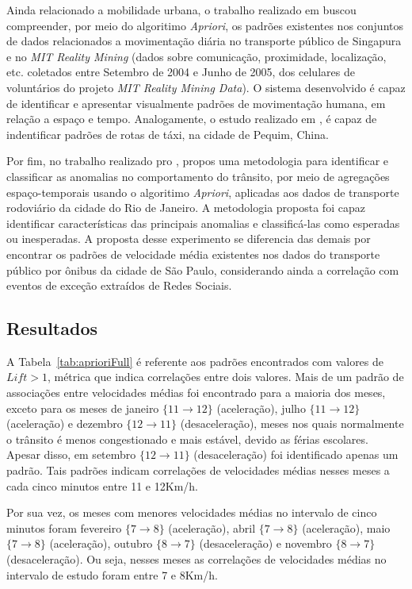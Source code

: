 \documentclass[
	12pt,				%
	oneside,			%
	a4paper,			%
	english,			%
	brazil				%
	]{abntex2ppgsi}
\begin{document}
{{{Ainda relacionado a mobilidade urbana, o trabalho realizado em \cite{zeng2017visual} buscou compreender, por meio do algoritimo \textit{Apriori}, os padrões existentes nos conjuntos de dados relacionados a movimentação diária no transporte público de Singapura e no \textit{MIT Reality Mining} (dados sobre comunicação, proximidade, localização, etc. coletados entre Setembro de 2004 e Junho de 2005, dos celulares de voluntários do projeto \textit{MIT Reality Mining Data}). O sistema desenvolvido é capaz de identificar e apresentar visualmente padrões de movimentação humana, em relação a espaço e tempo. Analogamente, o estudo realizado em \cite{yu2018discovering}, é capaz de indentificar padrões de rotas de táxi, na cidade de Pequim, China.

Por fim, no trabalho realizado pro \cite{cruz2018detecccao},  propos uma metodologia para identificar e classificar as anomalias no comportamento do trânsito, por meio de agregações espaço-temporais usando o algoritimo \textit{Apriori}, aplicadas aos dados de transporte rodoviário  da cidade do Rio de Janeiro. A metodologia proposta foi capaz identificar características das principais anomalias e classificá-las como esperadas ou inesperadas. A proposta desse experimento se diferencia das demais por encontrar os padrões de velocidade média existentes nos dados do transporte público por ônibus da cidade de São Paulo, considerando ainda a correlação com eventos de exceção extraídos de Redes Sociais.

\subsection{Resultados}

A Tabela~\ref{tab:aprioriFull} é referente aos padrões encontrados com valores de $\textit{Lift} > 1$, métrica que indica correlações entre dois valores. Mais de um padrão de associações entre velocidades médias foi encontrado para a maioria dos meses, exceto para os meses de janeiro $\lbrace 11 \rightarrow 12 \rbrace$ (aceleração), julho $\lbrace 11 \rightarrow 12\rbrace$ (aceleração) e dezembro $\lbrace12 \rightarrow 11\rbrace$ (desaceleração), meses nos quais normalmente o trânsito é menos congestionado e mais estável, devido as férias escolares. Apesar disso, em setembro $\lbrace12 \rightarrow 11\rbrace$ (desaceleração) foi identificado apenas um padrão. Tais padrões indicam correlações de velocidades médias nesses meses a cada cinco minutos entre 11 e 12Km/h.

Por sua vez, os meses com menores velocidades médias no intervalo de cinco minutos foram fevereiro $\lbrace 7 \rightarrow 8\rbrace$ (aceleração), abril $\lbrace 7 \rightarrow 8 \rbrace$ (aceleração), maio $\lbrace7 \rightarrow 8\rbrace$ (aceleração), outubro $\lbrace8 \rightarrow 7\rbrace$ (desaceleração) e novembro $\lbrace8 \rightarrow 7\rbrace$ (desaceleração). Ou seja, nesses meses as correlações de velocidades médias no intervalo de estudo foram entre 7 e 8Km/h.

}}}
\end{document}
